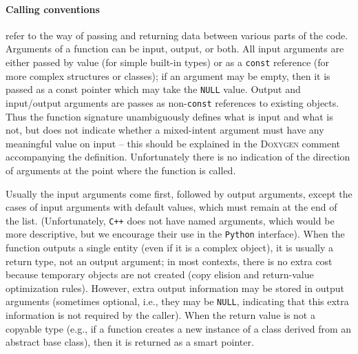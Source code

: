 \documentclass[12pt]{article}
\newcommand{\Cpp}  {\texttt{C++}\xspace}
\newcommand{\Python}{\texttt{Python}\xspace}
\begin{document}
\paragraph{Calling conventions} \label{sec:CallingConventions}  refer to the way of passing and returning data between various parts of the code. Arguments of a function can be input, output, or both. All input arguments are either passed by value (for simple built-in types) or as a \texttt{const} reference (for more complex structures or classes); if an argument may be empty, then it is passed as a const pointer which may take the \texttt{NULL} value. Output and input/output arguments are passes as non-\texttt{const} references to existing objects. Thus the function signature unambiguously defines what is input and what is not, but does not indicate whether a mixed-intent argument must have any meaningful value on input -- this should be explained in the \textsc{Doxygen} comment accompanying the definition. Unfortunately there is no indication of the direction of arguments at the point where the function is called.

Usually the input arguments come first, followed by output arguments, except the cases of input arguments with default values, which must remain at the end of the list. (Unfortunately, \Cpp does not have named arguments, which would be more descriptive, but we encourage their use in the \Python interface).
When the function outputs a single entity (even if it is a complex object), it is usually a return type, not an output argument; in most contexts, there is no extra cost because temporary objects are not created (copy elision and return-value optimization rules). However, extra output information may be stored in output arguments (sometimes optional, i.e., they may be \texttt{NULL}, indicating that this extra information is not required by the caller). When the return value is not a copyable type (e.g., if a function creates a new instance of a class derived from an abstract base class), then it is returned as a smart pointer.
\end{document}
